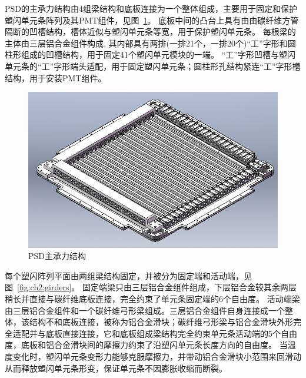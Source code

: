 PSD的主承力结构由4组梁结构和底板连接为一个整体组成，主要用于固定和保护塑闪单元条阵列及其PMT组件，见图~\ref{fig:ch2:bottom_plate}。
底板中间的凸台上具有由由碳纤维方管隔断的凹槽结构，槽体近似与塑闪单元条等宽，用于保护塑闪单元条。
每根梁的主体由三层铝合金组件构成, 其内部具有两排(一排21个，一排20个)“工”字形和圆柱形组成的凹槽结构，用于固定41个塑闪单元模块的一端。
“工”字形凹槽与塑闪单元条的“工”字形端头适配，用于固定塑闪单元条；圆柱形孔结构紧连“工”字形槽结构，用于安装PMT组件。

\begin{figure}[h!]
\centering
\includegraphics[width=0.7\linewidth]{chap/description/fig/bottom_plate}
\caption{PSD主承力结构}
\label{fig:ch2:bottom_plate}
\end{figure}

每个塑闪阵列平面由两组梁结构固定，并被分为固定端和活动端，见图~\ref{fig:ch2:girders}。
固定端梁只由三层铝合金组件组成，下层铝合金较其余两层稍长并直接与碳纤维底板连接，完全约束了单元条固定端的6个自由度。
活动端梁由三层铝合金组件和一个碳纤维弓形梁组成。三层铝合金组件自身连接成一个整体，该结构不和底板连接，被称为铝合金滑块；碳纤维弓形梁与铝合金滑块外形完全适配并与底板直接连接，它和底板组成梁结构完全约束单元条活动端的5个自由度，底板和铝合金滑块间的摩擦力约束了沿塑闪单元条长度方向的自由度。
当温度变化时，塑闪单元条变形力能够克服摩擦力，并带动铝合金滑块小范围来回滑动从而释放塑闪单元条形变，保证单元条不因膨胀收缩而断裂。


